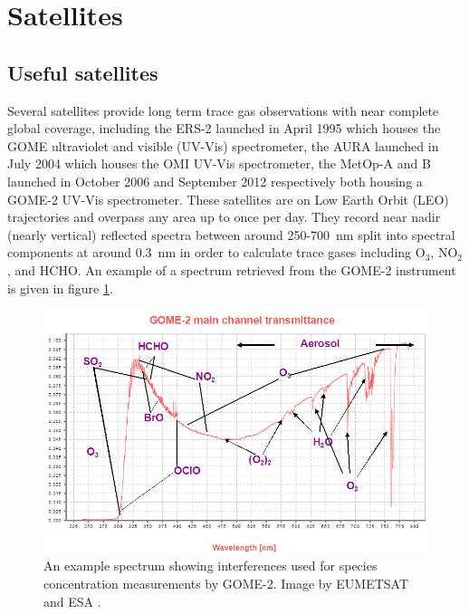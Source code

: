 \section{Satellites}
\label{ch1:sec:satellites}

  \subsection{Useful satellites}
    Several satellites provide long term trace gas observations with near complete global coverage, including the ERS-2 launched in April 1995 which houses the GOME ultraviolet and visible (UV-Vis) spectrometer, the AURA launched in July 2004 which houses the OMI UV-Vis spectrometer, the MetOp-A and B launched in October 2006 and September 2012 respectively both housing a GOME-2 UV-Vis spectrometer.
    These satellites are on Low Earth Orbit (LEO) trajectories and overpass any area up to once per day. 
    They record near nadir (nearly vertical) reflected spectra between around 250-700~nm split into spectral components at around $0.3$~nm in order to calculate trace gases including O$_3$, NO$_2$, and HCHO.
    An example of a spectrum retrieved from the GOME-2 instrument is given in figure \ref{ch1:fig:gomeproducts}.

    \begin{figure}
      \includegraphics[width=\textwidth]{Figures/GOME_SPECTRUM.jpg}
      \caption{An example spectrum showing interferences used for species concentration measurements by GOME-2. Image by EUMETSAT and ESA \citep{GOME2Image}.}
      \label{ch1:fig:gomeproducts}
    \end{figure}

